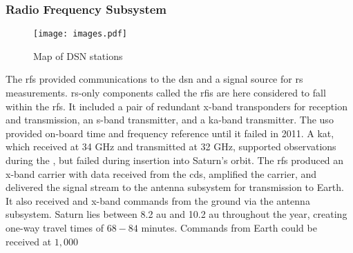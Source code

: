 \documentclass{article}
\begin{document}
            \subsubsection{%
                \footnotesize{Radio Frequency Subsystem}
            }
                \label{subsubsec:usr_rad_freq_subsys}
                \begin{wrapfigure}[16]{r}{0.5\textwidth}
                	\centering
                	\vspace{-5ex}
                	\texttt{[image: images.pdf]}
                	\caption{Map of DSN stations}
                	\label{fig:usr_dsn_map_1}
                \end{wrapfigure}
                The \gls{rfs} provided communications to the
                \gls{dsn} and a signal source for \gls{rs}
                measurements. \gls{rs}-only components called
                the \gls{rfis} are here considered to fall within
                the \gls{rfs}. It included a pair of redundant
                \gls{x-band} \glspl{transponder} for reception
                and transmission, an \gls{s-band}
                \gls{transmitter}, and a \gls{ka-band}
                \gls{transmitter}. The \gls{uso} provided
                on-board time and \gls{frequency} reference until
                it failed in 2011. A \gls{kat}, which received
                at 34 GHz and transmitted
                 at 32 GHz,
                supported
                observations during the
                , but failed
                during insertion into Saturn's orbit. The
                \gls{rfs} produced an \gls{x-band} \gls{carrier}
                 with data
                received from the \gls{cds}, amplified the
                 carrier, and
                delivered the signal stream to the antenna
                subsystem for transmission to Earth. It also
                received and 
                \gls{x-band} commands from the ground via the
                antenna subsystem. Saturn lies between 8.2
                \gls{au} and 10.2 \gls{au} throughout the year,
                creating one-way travel times of $68-84$ minutes.
                Commands from Earth could be received at $1,000$
\end{document}
